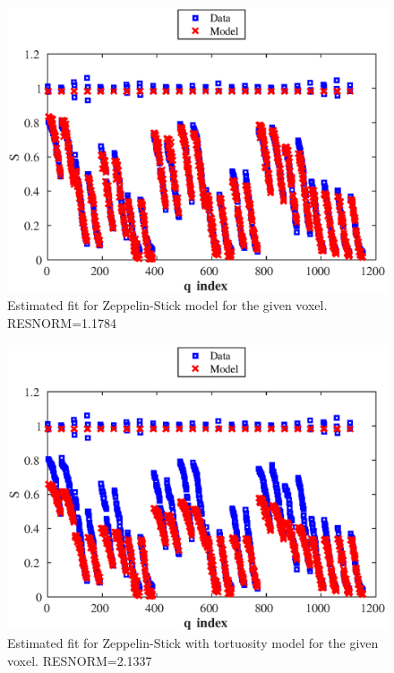 \documentclass[11pt,a4paper,oneside]{report}
\begin{document}
\begin{figure}[H]
\centering
\includegraphics[scale=0.8]{figures/q3/q132-ZeppStick.eps}
\caption{Estimated fit for Zeppelin-Stick model for the given voxel. RESNORM=1.1784}
\label{q132-ZeppStick}
\end{figure}

\begin{figure}[H]
\centering
\includegraphics[scale=0.8]{figures/q3/q132-ZeppStickTort.eps}
\caption{Estimated fit for Zeppelin-Stick with tortuosity model for the given voxel. RESNORM=2.1337}
\label{q132-ZeppStickTort}
\end{figure}
\end{document}
